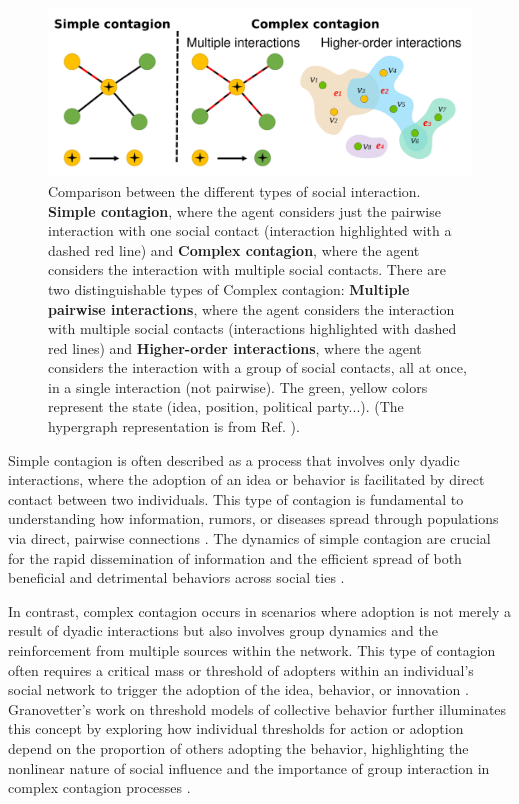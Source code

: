 \begin{figure}
    \centering
    \captionsetup{font=sf}
    \includegraphics[width=\textwidth]{Figs/Introduction/complex_simple.pdf}
    \caption[Simple and complex contagion processes]{Comparison between the different types of social interaction. {\bfseries Simple contagion}, where the agent considers just the pairwise interaction with one social contact (interaction highlighted with a dashed red line) and {\bfseries Complex contagion}, where the agent considers the interaction with multiple social contacts. There are two distinguishable types of Complex contagion: {\bfseries Multiple pairwise interactions}, where the agent considers the interaction with multiple social contacts (interactions highlighted with dashed red lines) and {\bfseries Higher-order interactions}, where the agent considers the interaction with a group of social contacts, all at once, in a single interaction (not pairwise). The green, yellow colors represent the state (idea, position, political party...). (The hypergraph representation is from Ref. \cite{de-arruda-2020}).}
    \label{fig:SimpleComplexContagion}
\end{figure}

Simple contagion is often described as a process that involves only dyadic interactions, where the adoption of an idea or behavior is facilitated by direct contact between two individuals. This type of contagion is fundamental to understanding how information, rumors, or diseases spread through populations via direct, pairwise connections \cite{pastor2001epidemic, newman2002spread}. The dynamics of simple contagion are crucial for the rapid dissemination of information and the efficient spread of both beneficial and detrimental behaviors across social ties \cite{christakis2007spread, fowler2009cooperative}.

In contrast, complex contagion occurs in scenarios where adoption is not merely a result of dyadic interactions but also involves group dynamics and the reinforcement from multiple sources within the network. This type of contagion often requires a critical mass or threshold of adopters within an individual's social network to trigger the adoption of the idea, behavior, or innovation \cite{centola-2007,centola-2010}. Granovetter's work on threshold models of collective behavior further illuminates this concept by exploring how individual thresholds for action or adoption depend on the proportion of others adopting the behavior, highlighting the nonlinear nature of social influence and the importance of group interaction in complex contagion processes \cite{granovetter-1978}.

